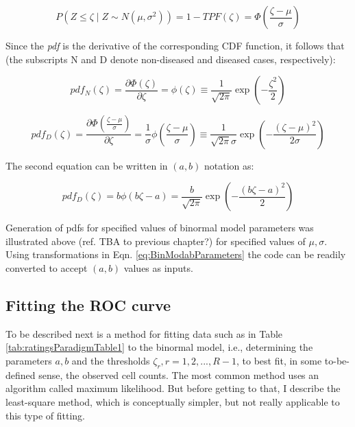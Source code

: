 \documentclass[
]{book}
\begin{document}
\begin{equation*} 
P\left ( Z \le \zeta \mid  Z\sim N\left ( \mu,\sigma^2 \right ) \right ) = 1-TPF\left ( \zeta \right ) = \Phi \left ( \frac{\zeta - \mu}{\sigma}  \right )
\end{equation*}

Since the \emph{pdf} is the derivative of the corresponding CDF function, it follows that (the subscripts N and D denote non-diseased and diseased cases, respectively):

\begin{equation*} 
pdf_N\left ( \zeta \right ) = \frac{\partial \Phi\left ( \zeta \right )}{\partial \zeta} = \phi\left ( \zeta \right ) \equiv \frac{1}{\sqrt{2 \pi}}\exp\left ( -\frac{\zeta^2}{2} \right )
\end{equation*}

\begin{equation*} 
pdf_D\left ( \zeta \right ) = \frac{\partial \Phi\left ( \frac{\zeta - \mu}{\sigma} \right )}{\partial \zeta} = \frac{1}{\sigma} \phi\left ( \frac{\zeta - \mu}{\sigma} \right ) \equiv \frac{1}{\sqrt{2 \pi}\sigma}\exp\left ( -\frac{\left (\zeta-\mu  \right )^2}{2\sigma} \right )
\end{equation*}

The second equation can be written in \((a,b)\) notation as:

\begin{equation*} 
pdf_D\left ( \zeta \right ) = b\phi\left ( b\zeta-a \right ) = \frac{b}{\sqrt{2 \pi}}\exp\left ( -\frac{\left (b\zeta - a \right )^2}{2} \right )
\end{equation*}

Generation of pdfs for specified values of binormal model parameters was illustrated above (ref. TBA to previous chapter?) for specified values of \(\mu,\sigma\). Using transformations in Eqn. \eqref{eq:BinModabParameters} the code can be readily converted to accept \((a,b)\) values as inputs.

\hypertarget{fitting-the-roc-curve}{%
\subsection{Fitting the ROC curve}\label{fitting-the-roc-curve}}

To be described next is a method for fitting data such as in Table \ref{tab:ratingsParadigmTable1} to the binormal model, i.e., determining the parameters \(a,b\) and the thresholds \(\zeta_r , r = 1, 2, ..., R-1\), to best fit, in some to-be-defined sense, the observed cell counts. The most common method uses an algorithm called maximum likelihood. But before getting to that, I describe the least-square method, which is conceptually simpler, but not really applicable to this type of fitting.
\end{document}

